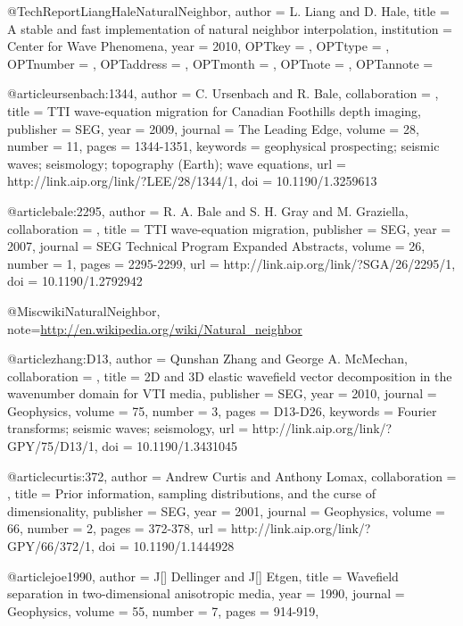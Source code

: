 {@TechReport{LiangHaleNaturalNeighbor,
  author = 	 {L. Liang and D. Hale},
  title = 	 {A stable and fast implementation of natural neighbor
                  interpolation},
  institution =  {Center for Wave Phenomena},
  year = 	 {2010},
  OPTkey = 	 {},
  OPTtype = 	 {},
  OPTnumber = 	 {},
  OPTaddress = 	 {},
  OPTmonth = 	 {},
  OPTnote = 	 {},
  OPTannote = 	 {}
}


@article{ursenbach:1344,
author = {C. Ursenbach and R. Bale},
collaboration = {},
title = {TTI wave-equation migration for Canadian Foothills depth imaging},
publisher = {SEG},
year = {2009},
journal = {The Leading Edge},
volume = {28},
number = {11},
pages = {1344-1351},
keywords = {geophysical prospecting; seismic waves; seismology; topography (Earth); wave equations},
url = {http://link.aip.org/link/?LEE/28/1344/1},
doi = {10.1190/1.3259613}
}







@article{bale:2295,
author = {R. A. Bale and S. H. Gray and M. Graziella},
collaboration = {},
title = {TTI wave-equation migration},
publisher = {SEG},
year = {2007},
journal = {SEG Technical Program Expanded Abstracts},
volume = {26},
number = {1},
pages = {2295-2299},
url = {http://link.aip.org/link/?SGA/26/2295/1},
doi = {10.1190/1.2792942}
}


@Misc{wikiNaturalNeighbor,
  note={\url{http://en.wikipedia.org/wiki/Natural_neighbor}  }
}



@article{zhang:D13,
author = {Qunshan Zhang and George A. McMechan},
collaboration = {},
title = {2{D} and 3{D} elastic wavefield vector decomposition in the wavenumber domain for VTI media},
publisher = {SEG},
year = {2010},
journal = {Geophysics},
volume = {75},
number = {3},
pages = {D13-D26},
keywords = {{F}ourier transforms; seismic waves; seismology},
url = {http://link.aip.org/link/?GPY/75/D13/1},
doi = {10.1190/1.3431045}
}



@article{curtis:372,
author = {Andrew Curtis and Anthony Lomax},
collaboration = {},
title = {Prior information, sampling distributions, and the curse of dimensionality},
publisher = {SEG},
year = {2001},
journal = {Geophysics},
volume = {66},
number = {2},
pages = {372-378},
url = {http://link.aip.org/link/?GPY/66/372/1},
doi = {10.1190/1.1444928}
}

@article{joe1990,
author = {J[] Dellinger and J[] Etgen},
title = {Wavefield separation in two-dimensional anisotropic media},
year = {1990},
journal = {Geophysics},
volume = {55},
number = {7},
pages = {914-919},
}

}
